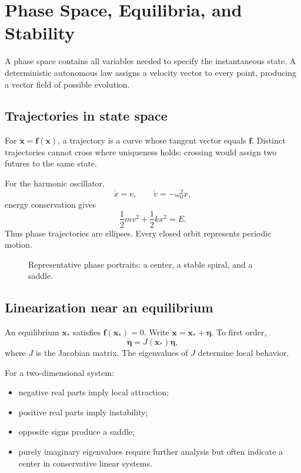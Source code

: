 \section{Phase Space, Equilibria, and Stability}
\label{sec:ch4-phase-space}

A phase space contains all variables needed to specify the instantaneous state. A deterministic autonomous law assigns a velocity vector to every point, producing a vector field of possible evolution.

\subsection{Trajectories in state space}
For $\dot{\mathbf{x}}=\mathbf{f}(\mathbf{x})$, a trajectory is a curve whose tangent vector equals $\mathbf{f}$. Distinct trajectories cannot cross where uniqueness holds: crossing would assign two futures to the same state.

For the harmonic oscillator,
\[
\dot x=v,\qquad \dot v=-\omega_0^2x,
\]
energy conservation gives
\[
\frac12mv^2+\frac12kx^2=E.
\]
Thus phase trajectories are ellipses. Every closed orbit represents periodic motion.

\begin{figure}[htbp]
\centering

\caption{Representative phase portraits: a center, a stable spiral, and a saddle.}
\label{fig:ch4-phase-portraits}
\end{figure}

\subsection{Linearization near an equilibrium}
An equilibrium $\mathbf{x}_*$ satisfies $\mathbf{f}(\mathbf{x}_*)=0$. Write $\mathbf{x}=\mathbf{x}_*+\boldsymbol{\eta}$. To first order,
\[
\dot{\boldsymbol{\eta}}=J(\mathbf{x}_*)\boldsymbol{\eta},
\]
where $J$ is the Jacobian matrix. The eigenvalues of $J$ determine local behavior.

For a two-dimensional system:
\begin{itemize}
\item negative real parts imply local attraction;
\item positive real parts imply instability;
\item opposite signs produce a saddle;
\item purely imaginary eigenvalues require further analysis but often indicate a center in conservative linear systems.
\end{itemize}

